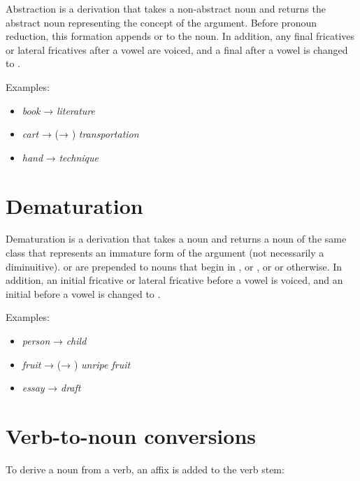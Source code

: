 \documentclass{book}
\begin{document}
Abstraction is a derivation that takes a non-abstract noun and returns the abstract noun representing the concept of the argument. Before pronoun reduction, this formation appends  or  to the noun. In addition, any final fricatives or lateral fricatives after a vowel are voiced, and a final  after a vowel is changed to .

Examples:

\begin{itemize}
    \item {} \emph{book} →  \emph{literature}
    \item {} \emph{cart} →  (→ ) \emph{transportation}
    \item {} \emph{hand} →  \emph{technique}
\end{itemize}

\section{Dematuration}

Dematuration is a derivation that takes a noun and returns a noun of the same class that represents an immature form of the argument (not necessarily a diminuitive).  or  are prepended to nouns that begin in ,  or , or  or  otherwise. In addition, an initial fricative or lateral fricative before a vowel is voiced, and an initial  before a vowel is changed to .

Examples:

\begin{itemize}
    \item {} \emph{person} →  \emph{child}
    \item {} \emph{fruit} →  (→ ) \emph{unripe fruit}
    \item {} \emph{essay} →  \emph{draft}
\end{itemize}

\section{Verb-to-noun conversions}

To derive a noun from a verb, an affix is added to the verb stem:
\end{document}
